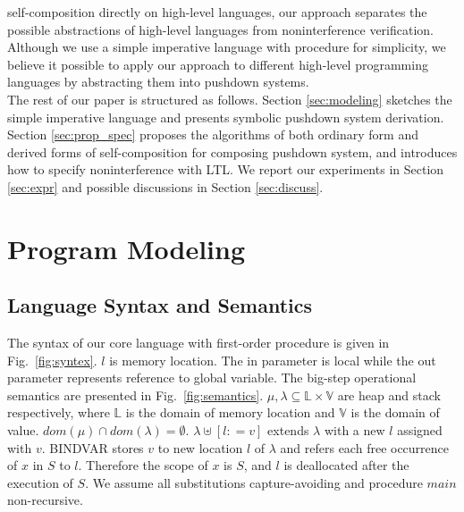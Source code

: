 \documentclass{llncs}
\begin{document}
self-composition directly on high-level
languages\cite{DBLP:conf/pldi/UnnoKY06}\cite{DBLP:conf/sas/TerauchiA05},
our approach separates the possible abstractions of high-level
languages from noninterference verification. Although we use a
simple imperative language with procedure for simplicity, we believe
it possible to apply our approach to different high-level
programming
languages by abstracting them into pushdown systems.\\
\indent The rest of our paper is structured as follows. Section
\ref{sec:modeling} sketches the simple imperative language and
presents symbolic pushdown system derivation. Section
\ref{sec:prop_spec} proposes the algorithms of both ordinary form
and derived forms of self-composition for composing pushdown system,
and introduces how to specify noninterference with LTL. We report
our experiments in Section \ref{sec:expr} and possible discussions
in Section \ref{sec:discuss}.

\section{\label{sec:modeling}Program Modeling}
\subsection{\label{subsec:language}Language Syntax and Semantics}

The syntax of our core language with first-order procedure is given
in Fig.~\ref{fig:syntex}. $l$ is memory location. The \textsf{in}
parameter is local while the \textsf{out} parameter represents
reference to global variable. The big-step operational semantics are
presented in Fig.~\ref{fig:semantics}. $\mu,\lambda\subseteq
\mathbb{L}\times \mathbb{V}$ are heap and stack respectively, where
$\mathbb{L}$ is the domain of memory location and $\mathbb{V}$ is
the domain of value. $dom(\mu)\cap dom(\lambda)=\emptyset$.
$\lambda\uplus[l\mathrel{\mathop:}= v]$ extends $\lambda$ with a new
$l$ assigned with $v$. BINDVAR stores $v$ to new location $l$ of
$\lambda$ and refers each free occurrence of $x$ in $S$ to $l$.
Therefore the scope of $x$ is $S$, and $l$ is deallocated after the
execution of $S$. We assume all substitutions capture-avoiding and
procedure $main$ non-recursive.
\end{document}
